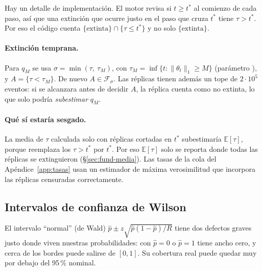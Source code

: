 \documentclass[11pt,a4paper]{article}
\theoremstyle{plain}
\theoremstyle{remark}
\newcommand{\fn}[1]{\texttt{\detokenize{#1}}}
\newcommand{\norm}[1]{\lVert #1\rVert}
\begin{document}
\noindent Hay un detalle de implementación. El motor revisa si $t\ge t^\ast$ al comienzo de cada paso, así que una extinción que ocurre justo en el paso que cruza $t^\ast$ tiene $\tau>t^\ast$. Por eso el código cuenta $\{\text{extinta}\}\cap\{\tau\le t^\ast\}$ y no solo $\{\text{extinta}\}$.

\paragraph{Extinción temprana.} Para $q_M$ se usa $\sigma=\min(\tau,\ \tau_M)$, con $\tau_M=\inf\{t:\norm{\theta_t}_1\ge M\}$ (parámetro \fn{l1_max}), y $A=\{\tau<\tau_M\}$. De nuevo $A\in\mathcal F_\sigma$. Las réplicas tienen además un tope de $2\cdot10^5$ eventos: si se alcanzara antes de decidir $A$, la réplica cuenta como no extinta, lo que solo podría \emph{subestimar} $q_M$.

\paragraph{Qué sí estaría sesgado.} La media de $\tau$ calculada solo con réplicas cortadas en $t^\ast$ subestimaría $\mathbb{E}[\tau]$, porque reemplaza los $\tau>t^\ast$ por $t^\ast$. Por eso $\mathbb{E}[\tau]$ solo se reporta donde todas las réplicas se extinguieron (\S\ref{sec:fund-media}). Las tasas de la cola del Apéndice~\ref{app:tasas} usan un estimador de máxima verosimilitud que incorpora las réplicas censuradas correctamente.

\subsection{Intervalos de confianza de Wilson}

El intervalo ``normal'' (de Wald) $\hat p\pm z\sqrt{\hat p(1-\hat p)/R}$ tiene dos defectos graves justo donde viven nuestras probabilidades: con $\hat p=0$ o $\hat p=1$ tiene ancho cero, y cerca de los bordes puede salirse de $[0,1]$. Su cobertura real puede quedar muy por debajo del 95\,\% nominal.
\end{document}
